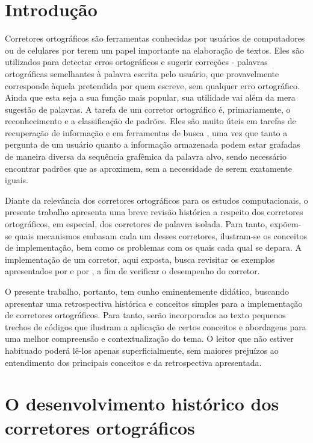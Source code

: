 \documentclass{textolivre}
\begin{document}
\section{Introdução}\label{sec-intro}

Corretores ortográficos são ferramentas conhecidas por usuários de computadores ou de celulares 
por terem um papel importante na elaboração de textos. Eles são utilizados para detectar erros 
ortográficos e sugerir correções - palavras ortográficas semelhantes à palavra escrita pelo usuário, 
que provavelmente corresponde àquela pretendida por quem escreve, sem qualquer erro ortográfico. 
Ainda que esta seja a sua função mais popular, sua utilidade vai além da mera sugestão de palavras. 
A tarefa de um corretor ortográfico é, primariamente, o reconhecimento e a classificação de padrões. 
Eles são muito úteis em tarefas de recuperação de informação e em ferramentas de busca \cite{brill2005,shazeer2007,cameron2013}, uma vez que 
tanto a pergunta de um usuário quanto a informação armazenada podem estar grafadas de maneira diversa 
da sequência grafêmica da palavra alvo,
sendo necessário encontrar padrões que as aproximem, sem a necessidade 
de serem exatamente iguais. 

Diante da relevância dos corretores ortográficos para os
estudos computacionais, o presente trabalho apresenta uma breve revisão histórica a respeito dos corretores ortográficos,
em especial, dos corretores de palavra isolada. Para
tanto, expõem-se quais mecanismos 
embasam cada um desses corretores, ilustram-se os conceitos de implementação, bem como os problemas com os quais cada qual se depara. 
A implementação de um corretor, aqui exposta, busca revisitar os exemplos apresentados por \textcite{norvig2007} e por \textcite{robbins2005}, 
a fim de verificar o desempenho do
corretor.

O presente trabalho, portanto, tem cunho eminentemente didático, 
buscando apresentar uma retrospectiva histórica e conceitos simples para a 
implementação de corretores ortográficos. Para tanto, 
serão incorporados ao texto pequenos trechos de códigos que ilustram a aplicação de certos 
conceitos e abordagens para uma melhor compreensão e contextualização do tema.
O leitor que não estiver habituado poderá lê-los apenas superficialmente, 
sem maiores prejuízos ao entendimento dos principais conceitos e
da retrospectiva apresentada.



\section{O desenvolvimento histórico dos corretores ortográficos}\label{sec-hist}
\end{document}
